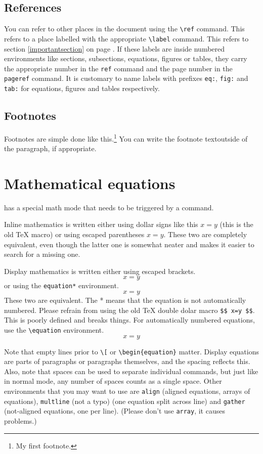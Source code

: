 \documentclass{article}
\begin{document}
\subsection{References}
You can refer to other places in the document using the \texttt{\textbackslash ref} command. This refers to a place labelled with the appropriate \texttt{\textbackslash label} command. This refers to section \ref{importantsection} on page \pageref{importantsection}. If these labels are inside numbered environments like sections, subsections, equations, figures or tables, they carry the appropriate number in the \texttt{ref} command and the page number in the \texttt{pageref} command. It is customary to name labels with prefixes \texttt{eq:}, \texttt{fig:} and \texttt{tab:} for equations, figures and tables respectively.
\subsection{Footnotes}
Footnotes are simple done like this.\footnote{My first footnote.} You can write the footnote text\footnotemark outside of the paragraph, if appropriate.

\section{Mathematical equations}
 has a special math mode that needs to be triggered by a command.

Inline mathematics is written either using dollar signs like this $x=y$ (this is the old \TeX{} macro) or using escaped parentheses \(x=y\). These two are completely equivalent, even though the latter one is somewhat neater and makes it easier to search for a missing one.

Display mathematics is written either using escaped brackets.
\[
x=y
\]
or using the \texttt{equation*} environment.
\begin{equation*}
    x=y
\end{equation*}
These two are equivalent. The * means that the equation is not automatically numbered. Please refrain from using the old \TeX{} double dolar macro \texttt{\$\$ x=y \$\$}. This is poorly defined and breaks things. For automatically numbered equations, use the \texttt{\textbackslash equation} environment.
\begin{equation}
    x=y
\end{equation}

Note that empty lines prior to \texttt{\textbackslash[} or \texttt{\textbackslash begin\{equation\}} matter. Display equations are parts of paragraphs or paragraphs themselves, and the spacing reflects this. Also, note that spaces can be used to separate individual commands, but just like in normal mode, any number of spaces counts as a single space. Other environments that you may want to use are \texttt{align} (aligned equations, arrays of equations), \texttt{multline} (not a typo) (one equation split across line) and \texttt{gather} (not-aligned equations, one per line). (Please don't use \texttt{array}, it causes problems.)
\end{document}
